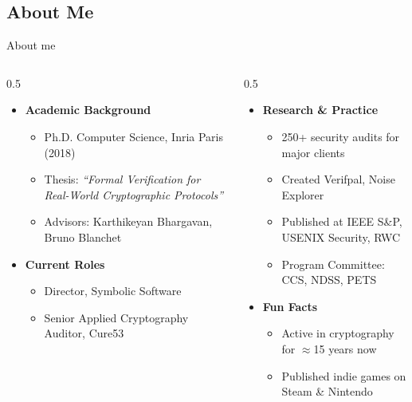 \ifdefined\PRESENTATION\else\PassOptionsToClass{handout}{beamer}\fi\documentclass[aspectratio=169, lualatex]{beamer}
\begin{document}
\subsection{About Me}

\begin{frame}{About me}
	\begin{columns}[c]
		\begin{column}{0.5\textwidth}
			\begin{itemize}
				\item \textbf{Academic Background}
				      \begin{itemize}[<+->]
					      \item Ph.D. Computer Science, Inria Paris (2018)
					      \item Thesis: \textit{``Formal Verification for Real-World Cryptographic Protocols''}
					      \item Advisors: Karthikeyan Bhargavan, Bruno Blanchet
				      \end{itemize}
			\end{itemize}
			\begin{itemize}
				\item \textbf{Current Roles}
				      \begin{itemize}[<+->]
					      \item Director, Symbolic Software
					      \item Senior Applied Cryptography Auditor, Cure53
				      \end{itemize}
			\end{itemize}
		\end{column}
		\begin{column}{0.5\textwidth}
			\begin{itemize}
				\item \textbf{Research \& Practice}
				      \begin{itemize}[<+->]
					      \item 250+ security audits for major clients
					      \item Created Verifpal, Noise Explorer
					      \item Published at IEEE S\&P, USENIX Security, RWC
					      \item Program Committee: CCS, NDSS, PETS
				      \end{itemize}
			\end{itemize}
			\begin{itemize}
				\item \textbf{Fun Facts}
				      \begin{itemize}[<+->]
					      \item Active in cryptography for $\approx$15 years now
					      \item Published indie games on Steam \& Nintendo
				      \end{itemize}
			\end{itemize}
		\end{column}
	\end{columns}
\end{frame}
\end{document}
